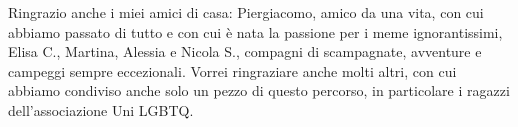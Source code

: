 \begin{small}
\newline
Ringrazio anche i miei amici di casa: Piergiacomo, amico da una vita, con cui abbiamo passato di tutto e con cui è nata la passione per i meme ignorantissimi, Elisa C., Martina, Alessia e Nicola S., compagni di scampagnate, avventure e campeggi sempre eccezionali.
\newline
Vorrei ringraziare anche molti altri, con cui abbiamo condiviso anche solo un pezzo di questo percorso, in particolare i ragazzi dell'associazione Uni LGBTQ.
\end{small}